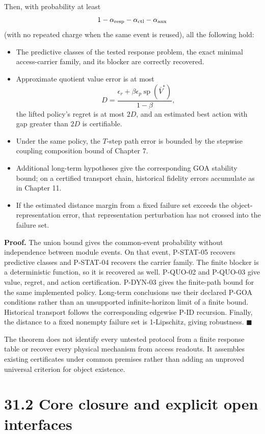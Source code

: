 \documentclass[
  english,
  11pt,
  oneside]{book}
\newcounter{none} %
\providecommand{\tightlist}{%
  \setlength{\itemsep}{0pt}\setlength{\parskip}{0pt}}
\begin{document}
Then, with probability at least \[1-\alpha_{\rm resp}-\alpha_{\rm ctl}-\alpha_{\rm aux}\] (with no repeated charge when the same event is reused), all the following hold:

\begin{itemize}
\tightlist
\item
  The predictive classes of the tested response problem, the exact minimal access-carrier family, and its blocker are correctly recovered.
\item
  Approximate quotient value error is at most \[D=\frac{\epsilon_r+\beta\epsilon_p\operatorname{sp}(\bar V^*)}{1-\beta},\] the lifted policy's regret is at most \(2D\), and an estimated best action with gap greater than \(2D\) is certifiable.
\item
  Under the same policy, the \(T\)-step path error is bounded by the stepwise coupling composition bound of Chapter 7.
\item
  Additional long-term hypotheses give the corresponding GOA stability bound; on a certified transport chain, historical fidelity errors accumulate as in Chapter 11.
\item
  If the estimated distance margin from a fixed failure set exceeds the object-representation error, that representation perturbation has not crossed into the failure set.
\end{itemize}

\textbf{Proof.} The union bound gives the common-event probability without independence between module events. On that event, P-STAT-05 recovers predictive classes and P-STAT-04 recovers the carrier family. The finite blocker is a deterministic function, so it is recovered as well. P-QUO-02 and P-QUO-03 give value, regret, and action certification. P-DYN-03 gives the finite-path bound for the same implemented policy. Long-term conclusions use their declared P-GOA conditions rather than an unsupported infinite-horizon limit of a finite bound. Historical transport follows the corresponding edgewise P-ID recursion. Finally, the distance to a fixed nonempty failure set is 1-Lipschitz, giving robustness. \(\blacksquare\)

The theorem does not identify every untested protocol from a finite response table or recover every physical mechanism from access readouts. It assembles existing certificates under common premises rather than adding an unproved universal criterion for object existence.

\section{31.2 Core closure and explicit open interfaces}\label{core-closure-and-explicit-open-interfaces}
\end{document}
